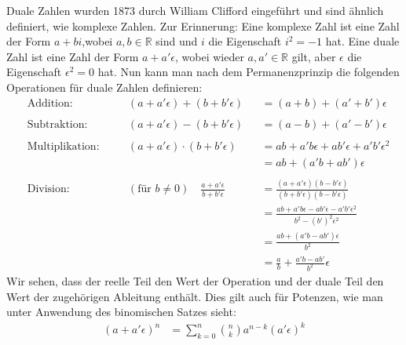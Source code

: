 \documentclass[
  letterpaper,
  DIV=11,
  oneside]{scrreprt}
\theoremstyle{definition}
\theoremstyle{definition}
\theoremstyle{remark}
\begin{document}
\begin{tcolorbox}[enhanced jigsaw, title=\textcolor{quarto-callout-note-color}{\faInfo}\hspace{0.5em}{Hintergrund: Duale Zahlen}, colbacktitle=quarto-callout-note-color!10!white, bottomrule=.15mm, titlerule=0mm, colback=white, breakable, colframe=quarto-callout-note-color-frame, bottomtitle=1mm, toptitle=1mm, leftrule=.75mm, arc=.35mm, left=2mm, rightrule=.15mm, toprule=.15mm, opacitybacktitle=0.6, opacityback=0, coltitle=black]
Duale Zahlen wurden 1873 durch William Clifford eingeführt und sind
ähnlich definiert, wie komplexe Zahlen. Zur Erinnerung: Eine komplexe
Zahl ist eine Zahl der Form \(a + bi\),wobei \(a,b \in \mathbb{R}\) sind
und \(i\) die Eigenschaft \(i^2 = -1\) hat. Eine duale Zahl ist eine
Zahl der Form \(a + a'\epsilon\), wobei wieder \(a,a' \in \mathbb{R}\)
gilt, aber \(\epsilon\) die Eigenschaft \(\epsilon^2 = 0\) hat. Nun kann
man nach dem Permanenzprinzip die folgenden Operationen für duale Zahlen
definieren: \[
\begin{alignat}{3}
    &\textrm{Addition:} && (a+a'\epsilon) + (b+b'\epsilon) &&= (a+b) + (a'+b')\epsilon \\ \\
    &\textrm{Subtraktion:} && (a+a'\epsilon) - (b+b'\epsilon) &&= (a-b) + (a'-b')\epsilon \\ \\
    &\textrm{Multiplikation:}\quad && (a+a'\epsilon) \cdot (b+b'\epsilon) &&= ab + a'b\epsilon + ab'\epsilon + a'b'\epsilon^2 \\
    & && &&= ab + (a'b + ab')\epsilon \\ \\
    &\textrm{Division:} && (\textrm{für }b\ne 0) \quad \frac{a+a'\epsilon}{b+b'\epsilon} &&= \frac{(a+a'\epsilon)(b-b'\epsilon)}{(b+b'\epsilon)(b-b'\epsilon)} \\
    & && &&= \frac{ab+a'b\epsilon-ab'\epsilon-a'b'\epsilon^2}{b^2 - (b')^2\epsilon^2} \\ 
    & && &&= \frac{ab + (a'b-ab')\epsilon}{b^2} \\ 
    & && &&= \frac{a}{b} + \frac{a'b - ab'}{b^2} \epsilon
\end{alignat}
\] Wir sehen, dass der reelle Teil den Wert der Operation und der duale
Teil den Wert der zugehörigen Ableitung enthält. Dies gilt auch für
Potenzen, wie man unter Anwendung des binomischen Satzes sieht: \[
\begin{align}
    (a+a'\epsilon)^n &= \sum_{k=0}^n \binom n k a^{n-k} (a'\epsilon)^k  \\

\end{align}\]
\end{tcolorbox}
\end{document}
